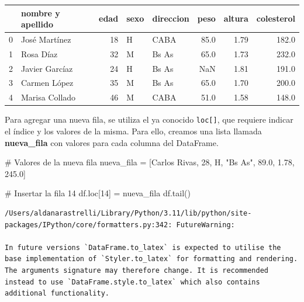 \documentclass[
  letterpaper,
  DIV=11,
  numbers=noendperiod]{scrreprt}
\newenvironment{Shaded}{\begin{snugshade}}{\end{snugshade}}
\newcommand{\CommentTok}[1]{\textcolor[rgb]{0.37,0.37,0.37}{#1}}
\newcommand{\DecValTok}[1]{\textcolor[rgb]{0.68,0.00,0.00}{#1}}
\newcommand{\FloatTok}[1]{\textcolor[rgb]{0.68,0.00,0.00}{#1}}
\newcommand{\NormalTok}[1]{\textcolor[rgb]{0.00,0.23,0.31}{#1}}
\newcommand{\OperatorTok}[1]{\textcolor[rgb]{0.37,0.37,0.37}{#1}}
\newcommand{\StringTok}[1]{\textcolor[rgb]{0.13,0.47,0.30}{#1}}
\begin{document}
\begin{tabular}{llrllrrr}
\toprule
{} & nombre y apellido &  edad & sexo & direccion &  peso &  altura &  colesterol \\
\midrule
0 &     José Martínez &    18 &    H &      CABA &  85.0 &    1.79 &       182.0 \\
1 &         Rosa Díaz &    32 &    M &     Bs As &  65.0 &    1.73 &       232.0 \\
2 &    Javier Garcíaz &    24 &    H &     Bs As &   NaN &    1.81 &       191.0 \\
3 &      Carmen López &    35 &    M &     Bs As &  65.0 &    1.70 &       200.0 \\
4 &    Marisa Collado &    46 &    M &      CABA &  51.0 &    1.58 &       148.0 \\
\bottomrule
\end{tabular}

Para agregar una nueva fila, se utiliza el ya conocido
\texttt{loc{[}{]}}, que requiere indicar el índice y los valores de la
misma. Para ello, creamos una lista llamada \textbf{nueva\_fila} con
valores para cada columna del DataFrame.

\begin{Shaded}
\begin{Highlighting}[]
\CommentTok{\# Valores de la nueva fila}
\NormalTok{nueva\_fila }\OperatorTok{=}\NormalTok{ [}\StringTok{\textquotesingle{}Carlos Rivas\textquotesingle{}}\NormalTok{, }\DecValTok{28}\NormalTok{, }\StringTok{\textquotesingle{}H\textquotesingle{}}\NormalTok{, }\StringTok{"Bs As"}\NormalTok{, }\FloatTok{89.0}\NormalTok{, }\FloatTok{1.78}\NormalTok{, }\FloatTok{245.0}\NormalTok{]}

\CommentTok{\# Insertar la fila 14}
\NormalTok{df.loc[}\DecValTok{14}\NormalTok{] }\OperatorTok{=}\NormalTok{ nueva\_fila}
\NormalTok{df.tail()}
\end{Highlighting}
\end{Shaded}

\begin{verbatim}
/Users/aldanarastrelli/Library/Python/3.11/lib/python/site-packages/IPython/core/formatters.py:342: FutureWarning:

In future versions `DataFrame.to_latex` is expected to utilise the base implementation of `Styler.to_latex` for formatting and rendering. The arguments signature may therefore change. It is recommended instead to use `DataFrame.style.to_latex` which also contains additional functionality.
\end{verbatim}
\end{document}
